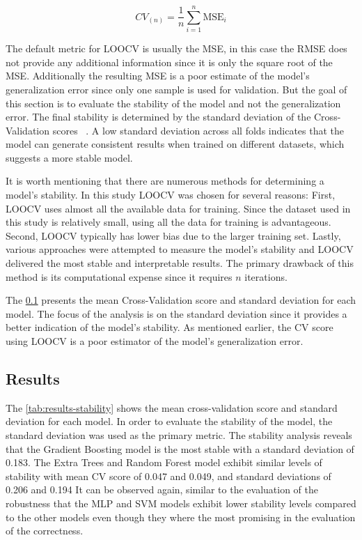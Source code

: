 \begin{tcolorbox}[arc=0pt,boxrule=0.5pt]
    \begin{equation}
        CV_{(n)} = \frac{1}{n} \sum_{i=1}^{n} \text{MSE}_{i}\label{eq:loocv}
    \end{equation}
\end{tcolorbox}

The default metric for \ac{LOOCV} is usually the MSE, in this case the RMSE does not provide any additional
information since it is only the square root of the MSE.
Additionally the resulting \ac{MSE} is a poor estimate of the model's
generalization error since only one sample is used for validation.
But the goal of this section is to evaluate the stability of the model and not the generalization error.
The final stability is determined by the standard deviation of the Cross-Validation scores
~\cite[p. 201]{gareth2013introduction}.
A low standard deviation across all folds indicates that the model can generate consistent results when trained on
different datasets, which suggests a more stable model.

It is worth mentioning that there are numerous methods for determining a model's stability.
In this study \ac{LOOCV} was chosen for several reasons:
First, \ac{LOOCV} uses almost all the available data for training.
Since the dataset used in this study is relatively small, using all the data for training is advantageous.
Second, \ac{LOOCV} typically has lower bias due to the larger training set.
Lastly, various approaches were attempted to measure the model's stability and \ac{LOOCV} delivered
the most stable and interpretable results.
The primary drawback of this method is its computational expense since it
requires $n$ iterations.

The \cref{subsec:results-stability} presents the mean Cross-Validation score and standard deviation for each model.
The focus of the analysis is on the standard deviation since it provides a better indication of the model's stability.
As mentioned earlier, the \ac{CV} score using \ac{LOOCV} is a poor estimator of the model's generalization error.

\subsection{Results}\label{subsec:results-stability}

The \cref{tab:results-stability} shows the mean cross-validation score and standard deviation for each model.
In order to evaluate the stability of the model, the standard deviation was used as the primary metric.
The stability analysis reveals that the Gradient Boosting model is the most stable with a standard
deviation of 0.183.
The Extra Trees and Random Forest model exhibit similar levels of stability with mean CV score of 0.047 and 0.049,
and standard deviations of 0.206 and 0.194
It can be observed again, similar to the evaluation of the robustness that the MLP and SVM models exhibit
lower stability levels compared to the other models even though they where the most promising in the evaluation of
the correctness.

